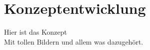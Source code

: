 \chapter{Konzeptentwicklung}
\label{chapter_Konzeptentwicklung}

Hier ist das Konzept\\
Mit tollen Bildern und allem was dazugehört.